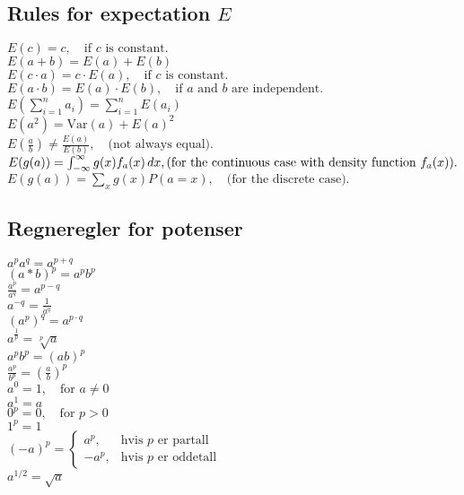 \documentclass[a4paper,7pt,fleqn]{article}
\begin{document}
\begin{multicols}{3}
\begin{minipage}{\linewidth}
\subsection{Rules for expectation \(E\)} 
\(E(c) = c, \quad \text{if } c \text{ is constant.}\) \\
\(E(a + b) = E(a) + E(b)\) \\
\(E(c \cdot a) = c \cdot E(a), \quad \text{if } c \text{ is constant.}\) \\
\(E(a \cdot b) = E(a) \cdot E(b), \quad \text{if } a \text{ and } b \text{ are independent.}\) \\
\(E\left( \sum_{i=1}^n a_i \right) = \sum_{i=1}^n E(a_i)\) \\
\(E(a^2) = \text{Var}(a) + E(a)^2\) \\
\(E\left(\frac{a}{b}\right) \neq \frac{E(a)}{E(b)}, \quad \text{(not always equal).}\) \\
\(E(g(a)) = \int_{-\infty}^\infty g(x) f_a(x) \, dx, \quad \\ 
\text{(for the continuous case with density function } f_a(x)\text{).}\) \\
\(E(g(a)) = \sum_{x} g(x) P(a = x), \quad \text{(for the discrete case).}\)
\end{minipage}

\begin{minipage}{\linewidth}
\subsection{Regneregler for potenser}
\(a^p a^q = a^{p+q}\) \\
\((a*b)^p = a^p b^p\) \\
\(\frac{a^p}{a^q} = a^{p-q}\) \\
\(a^{-q} = \frac{1}{a^q}\) \\
\((a^p)^q = a^{p \cdot q}\) \\
\(a^{\frac{1}{p}} = \sqrt[p]{a}\) \\
\(a^p b^p = (ab)^p\) \\
\(\frac{a^p}{b^p} = \left(\frac{a}{b}\right)^p\) \\
\(a^0 = 1, \quad \text{for } a \neq 0\) \\
\(a^1 = a\) \\
\(0^p = 0, \quad \text{for } p > 0\) \\
\(1^p = 1\) \\
\((-a)^p = 
\begin{cases} 
    a^p, & \text{hvis } p \text{ er partall} \\
    -a^p, & \text{hvis } p \text{ er oddetall} 
\end{cases}\) \\
\(a^{1/2} = \sqrt{a}\)
\end{minipage}


\end{multicols}
\end{document}
